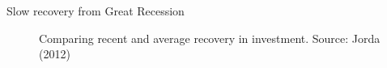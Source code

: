 

\begin{frame}{Slow recovery from Great Recession}

\begin{figure}
\begin{center}


\caption{Comparing recent and average recovery in investment. Source: Jorda (2012)}

\end{center}
\end{figure}

\end{frame}



